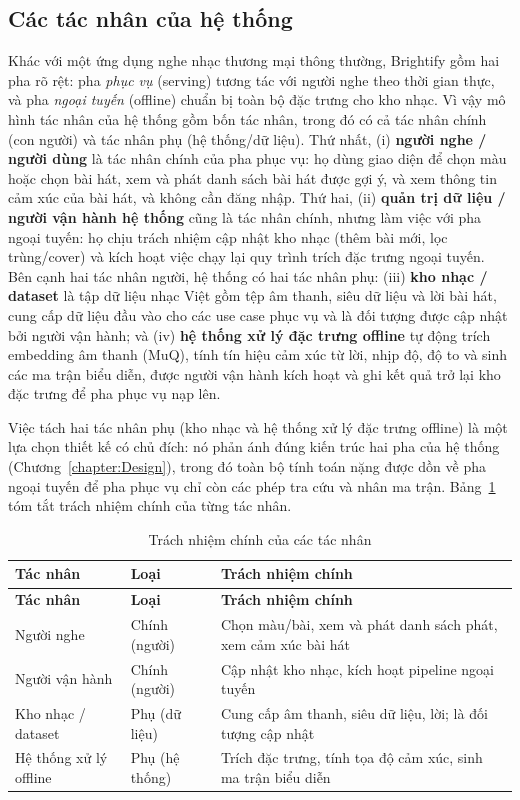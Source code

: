 \documentclass[../DoAn.tex]{subfiles}
\begin{document}
\subsection{Các tác nhân của hệ thống}
\label{subsection:2.2.1}
Khác với một ứng dụng nghe nhạc thương mại thông thường, Brightify gồm hai pha rõ rệt: pha \textit{phục vụ} (serving) tương tác với người nghe theo thời gian thực, và pha \textit{ngoại tuyến} (offline) chuẩn bị toàn bộ đặc trưng cho kho nhạc. Vì vậy mô hình tác nhân của hệ thống gồm bốn tác nhân, trong đó có cả tác nhân chính (con người) và tác nhân phụ (hệ thống/dữ liệu). Thứ nhất, (i) \textbf{người nghe / người dùng} là tác nhân chính của pha phục vụ: họ dùng giao diện để chọn màu hoặc chọn bài hát, xem và phát danh sách bài hát được gợi ý, và xem thông tin cảm xúc của bài hát, và không cần đăng nhập. Thứ hai, (ii) \textbf{quản trị dữ liệu / người vận hành hệ thống} cũng là tác nhân chính, nhưng làm việc với pha ngoại tuyến: họ chịu trách nhiệm cập nhật kho nhạc (thêm bài mới, lọc trùng/cover) và kích hoạt việc chạy lại quy trình trích đặc trưng ngoại tuyến. Bên cạnh hai tác nhân người, hệ thống có hai tác nhân phụ: (iii) \textbf{kho nhạc / dataset} là tập dữ liệu nhạc Việt gồm tệp âm thanh, siêu dữ liệu và lời bài hát, cung cấp dữ liệu đầu vào cho các use case phục vụ và là đối tượng được cập nhật bởi người vận hành; và (iv) \textbf{hệ thống xử lý đặc trưng offline} tự động trích embedding âm thanh (MuQ), tính tín hiệu cảm xúc từ lời, nhịp độ, độ to và sinh các ma trận biểu diễn, được người vận hành kích hoạt và ghi kết quả trở lại kho đặc trưng để pha phục vụ nạp lên.

Việc tách hai tác nhân phụ (kho nhạc và hệ thống xử lý đặc trưng offline) là một lựa chọn thiết kế có chủ đích: nó phản ánh đúng kiến trúc hai pha của hệ thống (Chương~\ref{chapter:Design}), trong đó toàn bộ tính toán nặng được dồn về pha ngoại tuyến để pha phục vụ chỉ còn các phép tra cứu và nhân ma trận. Bảng~\ref{table:actors} tóm tắt trách nhiệm chính của từng tác nhân.

\begin{longtable}{|p{4.0cm}|p{3.0cm}|p{6.0cm}|}
\caption{Trách nhiệm chính của các tác nhân}\label{table:actors}\\
\hline
\textbf{Tác nhân} & \textbf{Loại} & \textbf{Trách nhiệm chính} \\
\hline
\endfirsthead
\hline
\textbf{Tác nhân} & \textbf{Loại} & \textbf{Trách nhiệm chính} \\
\hline
\endhead
Người nghe & Chính (người) & Chọn màu/bài, xem và phát danh sách phát, xem cảm xúc bài hát \\
\hline
Người vận hành & Chính (người) & Cập nhật kho nhạc, kích hoạt pipeline ngoại tuyến \\
\hline
Kho nhạc / dataset & Phụ (dữ liệu) & Cung cấp âm thanh, siêu dữ liệu, lời; là đối tượng cập nhật \\
\hline
Hệ thống xử lý offline & Phụ (hệ thống) & Trích đặc trưng, tính tọa độ cảm xúc, sinh ma trận biểu diễn \\
\hline
\end{longtable}
\end{document}
